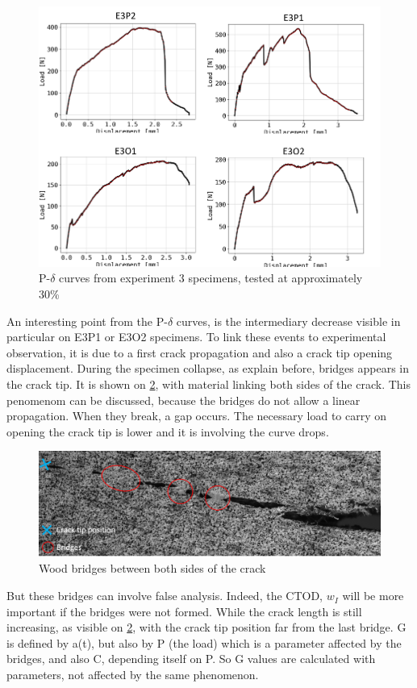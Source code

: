 \begin{figure}[th]
	\centering
	\includegraphics[scale=0.8]{Figures/E3p_Pdel}
	\caption[P-$\delta$ curves for specimen at 30\%]{P-$\delta$ curves from experiment 3 specimens, tested at approximately 30\%}
	\label{E3p_Pdel}
\end{figure}

An interesting point from the P-$\delta$ curves, is the intermediary decrease visible in particular on E3P1 or E3O2 specimens. To link these events to experimental observation, it is due to a first crack propagation and also a crack tip opening displacement. During the specimen collapse, as explain before, bridges appears in the crack tip. It is shown on \ref{fig:Res_bridges}, with material linking both sides of the crack. This penomenom can be discussed, because the bridges do not allow a linear propagation. When they break, a gap occurs. The necessary load to carry on opening the crack tip is lower and it is involving the curve drops. 
\begin{figure}[th]
	\centering
	\includegraphics[width=\textwidth]{Figures/crack_bridges}
	\caption[Crack bridges]{Wood bridges between both sides of the crack}
	\label{fig:Res_bridges}
\end{figure}
But these bridges can involve false analysis. Indeed, the CTOD, $w_{I}$ will be more important if the bridges were not formed. While the crack length is still increasing, as visible on \ref{fig:Res_bridges}, with the crack tip position far from the last bridge. G is defined by a(t), but also by P (the load) which is a parameter affected by the bridges, and also C, depending itself on P. So G values are calculated with parameters, not affected by the same phenomenon.

